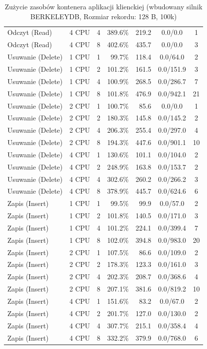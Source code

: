 \begin{table}[ht]
{\begin{tabular}{llcrrcc}
Odczyt (Read) & 4 CPU & 4 & 389.6\% & 219.2 & 0.0/0.0 & 1 \\
Odczyt (Read) & 4 CPU & 8 & 402.6\% & 435.7 & 0.0/0.0 & 3 \\
Usuwanie (Delete) & 1 CPU & 1 & 99.7\% & 118.4 & 0.0/64.0 & 2 \\
Usuwanie (Delete) & 1 CPU & 2 & 101.2\% & 161.5 & 0.0/151.9 & 3 \\
Usuwanie (Delete) & 1 CPU & 4 & 100.9\% & 268.5 & 0.0/286.7 & 7 \\
Usuwanie (Delete) & 1 CPU & 8 & 101.8\% & 476.9 & 0.0/942.1 & 21 \\
Usuwanie (Delete) & 2 CPU & 1 & 100.7\% & 85.6 & 0.0/0.0 & 1 \\
Usuwanie (Delete) & 2 CPU & 2 & 180.3\% & 145.8 & 0.0/145.2 & 2 \\
Usuwanie (Delete) & 2 CPU & 4 & 206.3\% & 255.4 & 0.0/297.0 & 4 \\
Usuwanie (Delete) & 2 CPU & 8 & 194.3\% & 447.6 & 0.0/901.1 & 10 \\
Usuwanie (Delete) & 4 CPU & 1 & 130.6\% & 101.1 & 0.0/104.0 & 2 \\
Usuwanie (Delete) & 4 CPU & 2 & 248.9\% & 163.8 & 0.0/153.7 & 2 \\
Usuwanie (Delete) & 4 CPU & 4 & 302.6\% & 260.2 & 0.0/266.2 & 3 \\
Usuwanie (Delete) & 4 CPU & 8 & 378.9\% & 445.7 & 0.0/624.6 & 6 \\
Zapis (Insert) & 1 CPU & 1 & 99.5\% & 99.9 & 0.0/57.0 & 2 \\
Zapis (Insert) & 1 CPU & 2 & 101.8\% & 140.5 & 0.0/171.0 & 3 \\
Zapis (Insert) & 1 CPU & 4 & 101.2\% & 224.1 & 0.0/399.4 & 7 \\
Zapis (Insert) & 1 CPU & 8 & 102.0\% & 394.8 & 0.0/983.0 & 20 \\
Zapis (Insert) & 2 CPU & 1 & 107.5\% & 86.6 & 0.0/109.0 & 2 \\
Zapis (Insert) & 2 CPU & 2 & 178.3\% & 123.3 & 0.0/161.0 & 3 \\
Zapis (Insert) & 2 CPU & 4 & 202.3\% & 208.7 & 0.0/368.6 & 4 \\
Zapis (Insert) & 2 CPU & 8 & 207.1\% & 381.6 & 0.0/819.2 & 10 \\
Zapis (Insert) & 4 CPU & 1 & 151.6\% & 83.2 & 0.0/67.0 & 2 \\
Zapis (Insert) & 4 CPU & 2 & 201.7\% & 127.0 & 0.0/130.0 & 2 \\
Zapis (Insert) & 4 CPU & 4 & 307.7\% & 215.1 & 0.0/358.4 & 4 \\
Zapis (Insert) & 4 CPU & 8 & 332.2\% & 379.9 & 0.0/768.0 & 6 \\
\bottomrule
\end{tabular}%
}
\caption{Zużycie zasobów kontenera aplikacji klienckiej (wbudowany silnik BERKELEYDB, Rozmiar rekordu: 128 B, 100k)}
\label{tab:resources_berkeleydb_small_100000}
\end{table}
